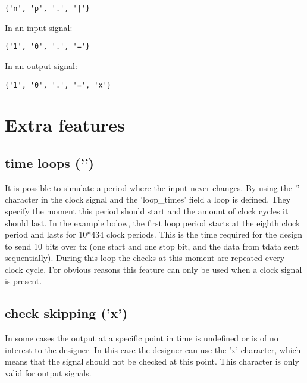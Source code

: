 \textbf{} 
\begin{lstlisting}[style=json]
{'n', 'p', '.', '|'}
\end{lstlisting}
In an input signal: 
\begin{lstlisting}[style=json]
{'1', '0', '.', '='}
\end{lstlisting}
In an output signal: 
\begin{lstlisting}[style=json]
{'1', '0', '.', '=', 'x'}
\end{lstlisting}\newpage
\section{Extra features}
\subsection{time loops ('\textbar')}
It is possible to simulate a period where the input never changes. By using the '\textbar' character in the clock signal and the 'loop\_times' field a loop is defined. They specify the moment this period should start and the amount of clock cycles it should last. In the example bolow, the first loop period starts at the eighth clock period and lasts for 10*434 clock periods. This is the time required for the design to send 10 bits over tx (one start and one stop bit, and the data from tdata sent sequentially). During this loop the checks at this moment are repeated every clock cycle. For obvious reasons this feature can only be used when a clock signal is present.
\subsection{check skipping ('x')}
In some cases the output at a specific point in time is undefined or is of no interest to the designer. In this case the designer can use the 'x' character, which means that the signal should not be checked at this point. This character is only valid for output signals.\newpage
